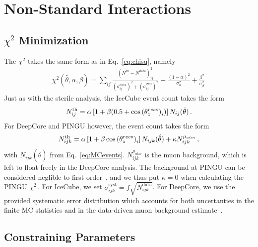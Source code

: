 % 
% 
\section{Non-Standard Interactions}
\subsection{\texorpdfstring{$\chi^2$}{Chi-squared} Minimization}
The $\chi^2$ takes the same form as in Eq.~\ref{eq:chisq}, namely 
\begin{align} \label{eq:chisq2}
    \chi^{2}(\hat{\theta},\alpha,\beta)=\sum_{ij} \frac{\left(N^\text{th}-N^\text{data}\right)_{ij}^{2}}
    {\left(\sigma^\text{data}_{ij}\right)^{2} + \left(\sigma^\text{syst}_{ij}\right)^{2}}+ 
    \frac{(1-\alpha)^2}{\sigma_\alpha^2} + \frac{\beta^2}{\sigma_\beta^2}\,
\end{align}
Just as with the sterile analysis, the IceCube event count takes the form 
\begin{align}
    N^\text{th}_{ij} = \alpha\left[1+\beta (0.5 + \cos{(\theta_z^{reco})}_i )\right] N_{ij}(\hat{\theta})\,.
\end{align}
For DeepCore and PINGU however, the event count takes the form
\begin{align}
    N^\text{th}_{ijk} = \alpha\left[1+\beta \cos{(\theta_z^{reco})}_i \right] N_{ijk}(\hat{\theta}) + \kappa N_{ijk}^{\mu_{atm}}\,,
\end{align}
with $N_{ijk}(\hat{\theta})$ from Eq.~\ref{eq:MCevents}. $N_{ijk}^{\mu_{atm}}$ is the muon background, which is left to float freely in the DeepCore analysis.
The background at PINGU can be considered neglible to first order~\cite{PINGUdata}, and we thus put $\kappa=0$ when calculating the PINGU $\chi^2$\,.
For IceCube, we set $\sigma_{ijk}^\text{syst} = f\sqrt{N_{ijk}^\text{data}}$.
For DeepCore, we use the provided systematic error distribution which accounts for both uncertanties in the finite MC statistics and in the data-driven 
muon background estimate~\cite{DC2019data}.
\subsection{Constraining Parameters}

% 
